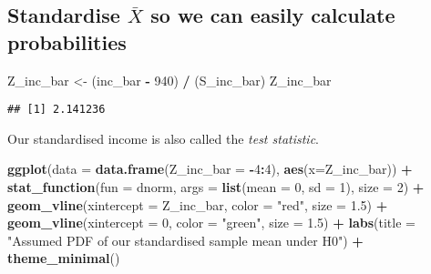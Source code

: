 \documentclass[]{article}
\newenvironment{Shaded}{\begin{snugshade}}{\end{snugshade}}
\newcommand{\KeywordTok}[1]{\textcolor[rgb]{0.13,0.29,0.53}{\textbf{#1}}}
\newcommand{\DataTypeTok}[1]{\textcolor[rgb]{0.13,0.29,0.53}{#1}}
\newcommand{\DecValTok}[1]{\textcolor[rgb]{0.00,0.00,0.81}{#1}}
\newcommand{\FloatTok}[1]{\textcolor[rgb]{0.00,0.00,0.81}{#1}}
\newcommand{\StringTok}[1]{\textcolor[rgb]{0.31,0.60,0.02}{#1}}
\newcommand{\OperatorTok}[1]{\textcolor[rgb]{0.81,0.36,0.00}{\textbf{#1}}}
\newcommand{\NormalTok}[1]{#1}
\begin{document}
\subsection{\texorpdfstring{Standardise \(\bar{X}\) so we can easily
calculate
probabilities}{Standardise \textbackslash{}bar\{X\} so we can easily calculate probabilities}}\label{standardise-barx-so-we-can-easily-calculate-probabilities}

\begin{Shaded}
\begin{Highlighting}[]
\NormalTok{Z_inc_bar <-}\StringTok{ }\NormalTok{(inc_bar }\OperatorTok{-}\StringTok{ }\DecValTok{940}\NormalTok{) }\OperatorTok{/}\StringTok{ }\NormalTok{(S_inc_bar)}
\NormalTok{Z_inc_bar}
\end{Highlighting}
\end{Shaded}

\begin{verbatim}
## [1] 2.141236
\end{verbatim}

Our standardised income is also called the \emph{test statistic}.

\begin{Shaded}
\begin{Highlighting}[]
\KeywordTok{ggplot}\NormalTok{(}\DataTypeTok{data =}  \KeywordTok{data.frame}\NormalTok{(}\DataTypeTok{Z_inc_bar =} \OperatorTok{-}\DecValTok{4}\OperatorTok{:}\DecValTok{4}\NormalTok{), }\KeywordTok{aes}\NormalTok{(}\DataTypeTok{x=}\NormalTok{Z_inc_bar)) }\OperatorTok{+}
\StringTok{  }\KeywordTok{stat_function}\NormalTok{(}\DataTypeTok{fun =}\NormalTok{ dnorm, }\DataTypeTok{args =} \KeywordTok{list}\NormalTok{(}\DataTypeTok{mean =} \DecValTok{0}\NormalTok{, }\DataTypeTok{sd =} \DecValTok{1}\NormalTok{), }\DataTypeTok{size =} \DecValTok{2}\NormalTok{) }\OperatorTok{+}
\StringTok{  }\KeywordTok{geom_vline}\NormalTok{(}\DataTypeTok{xintercept =}\NormalTok{ Z_inc_bar, }\DataTypeTok{color =} \StringTok{"red"}\NormalTok{, }\DataTypeTok{size =} \FloatTok{1.5}\NormalTok{) }\OperatorTok{+}
\StringTok{  }\KeywordTok{geom_vline}\NormalTok{(}\DataTypeTok{xintercept =} \DecValTok{0}\NormalTok{, }\DataTypeTok{color =} \StringTok{"green"}\NormalTok{, }\DataTypeTok{size =} \FloatTok{1.5}\NormalTok{) }\OperatorTok{+}
\StringTok{  }\KeywordTok{labs}\NormalTok{(}\DataTypeTok{title =} \StringTok{"Assumed PDF of our standardised sample mean under H0"}\NormalTok{) }\OperatorTok{+}
\StringTok{  }\KeywordTok{theme_minimal}\NormalTok{()}
\end{Highlighting}
\end{Shaded}
\end{document}
